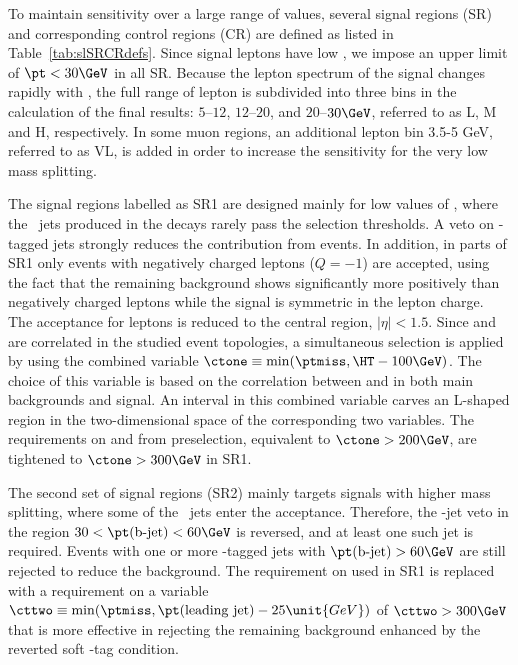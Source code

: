 To maintain sensitivity over a large range of \DM values, several signal regions (SR) and corresponding control regions (CR) are defined as listed in Table~\ref{tab:slSRCRdefs}.
Since signal leptons have low \pt, we impose an upper limit of $\pt<30\GeV$ in all SR.
Because the lepton \pt spectrum of the signal changes rapidly with \DM, the full range of lepton \pt is subdivided into three bins in the calculation of the final results: $5$--$12$, $12$--$20$, and $20$--$30\GeV$, referred to as L, M and H, respectively.
In some muon regions, an additional lepton \pt bin 3.5-5 GeV, referred to as VL, is added in order to increase the sensitivity for the very low mass splitting.

The signal regions labelled as SR1 are designed mainly for low values of \DM, where the \cPqb\ jets produced in the \sTop decays rarely pass the selection thresholds.
A veto on \cPqb-tagged jets strongly reduces the contribution from \ttbar events.
In addition, in parts of SR1 only events with negatively charged leptons ($Q = -1$) are accepted, using the fact that the remaining \Wjets background shows significantly more positively than negatively charged leptons while the signal is symmetric in the lepton charge.
The acceptance for leptons is reduced to the central region, $|\eta|<1.5$.
Since \ptmiss and \HT are correlated in the studied event topologies, a simultaneous selection is applied by using the combined variable $\ctone \equiv \min(\ptmiss,\HT-100\GeV)$. The choice of this variable is based on the correlation between \ptmiss and \HT in both main backgrounds and signal. An interval in this combined variable carves an L-shaped region in the two-dimensional space of the corresponding two variables.
The requirements on \ptmiss and \HT from preselection, equivalent to $\ctone > 200\GeV$, are tightened to $\ctone > 300\GeV$ in SR1.

The second set of signal regions (SR2) mainly targets signals with higher mass splitting, where some of the \cPqb\ jets enter the acceptance.
Therefore, the \cPqb-jet veto in the region $30<\pt(\text{b-jet})<60\GeV$ is reversed, and at least one such jet is required.
Events with one or more \cPqb-tagged jets with $\pt(\text{b-jet})>60\GeV$ are still rejected to reduce the \ttbar background.
The requirement on \ctone used in SR1 is replaced with a requirement on a variable 
$\cttwo \equiv \min(\ptmiss,\pt(\mathrm{leading\ jet})-25\unit{GeV})$ of $\cttwo > 300\GeV$ that is more effective 
in rejecting the remaining \ttbar background enhanced by the reverted soft \cPqb-tag condition. 

